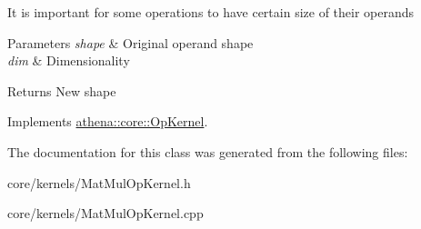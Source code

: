 It is important for some operations to have certain size of their operands 
\begin{DoxyParams}{Parameters}
{\em shape} & Original operand shape \\
\hline
{\em dim} & Dimensionality \\
\hline
\end{DoxyParams}
\begin{DoxyReturn}{Returns}
New shape 
\end{DoxyReturn}


Implements \mbox{\hyperlink{classathena_1_1core_1_1_op_kernel_a762e541463ffd089b47a8e6755c30fe1}{athena\+::core\+::\+Op\+Kernel}}.



The documentation for this class was generated from the following files\+:\begin{DoxyCompactItemize}
\item 
core/kernels/Mat\+Mul\+Op\+Kernel.\+h\item 
core/kernels/Mat\+Mul\+Op\+Kernel.\+cpp\end{DoxyCompactItemize}
